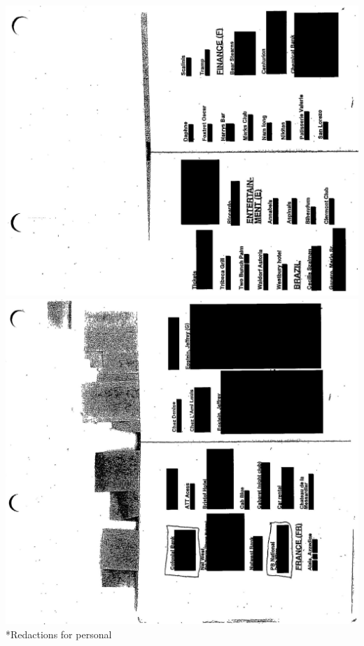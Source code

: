 \documentclass[10pt]{article}
\begin{document}
\includegraphics[max width=\textwidth, center]{2025_02_27_dd68c3d38de88f0516d9g-185}\\
\includegraphics[max width=\textwidth, center]{2025_02_27_dd68c3d38de88f0516d9g-186}\\
*Redactions for personal\\
\end{document}
